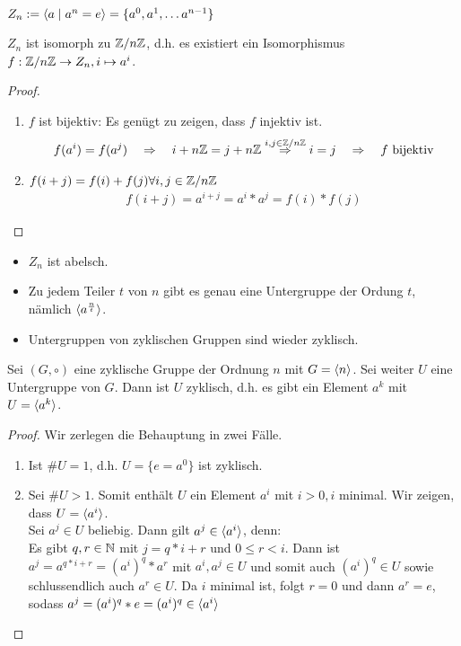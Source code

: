 \begin{defin}
	$Z_n := \langle a \mid a^n = e \rangle = \{a^0,a^1, \dots a^{n-1}\}$
\end{defin}
\begin{lemma}
	$Z_n$ ist isomorph zu $\mathbb{Z} / n \mathbb{Z}$, d.h. es existiert ein Isomorphismus $f: \mathbb{Z} / n \mathbb{Z} \to Z_n, i \mapsto a^i$.
\end{lemma}
\begin{proof}
	\begin{enumerate}
		\item $f$ ist bijektiv: Es genügt zu zeigen, dass $f$ injektiv ist. \\
		\begin{align*}
		f(a^i) = f(a^j) \quad \Rightarrow \quad i + n\mathbb{Z} = j +n\mathbb{Z} \overset{i,j \in \mathbb{Z} / n \mathbb{Z}}{\quad \Rightarrow \quad} i=j \quad \Rightarrow \quad f \text{ bijektiv}
		\end{align*}
		\item $f(i+j) = f(i) + f(j) \forall i,j \in \mathbb{Z} / n \mathbb{Z}$ \\
		\begin{align*}
		f(i+j) = a^{i+j} = a^i * a^j = f(i) * f(j)
		\end{align*}
	\end{enumerate}
\end{proof}

\begin{bem}
	\begin{itemize}
		\item $Z_n$ ist abelsch.
		\item Zu jedem Teiler $t$ von $n$ gibt es genau eine Untergruppe der Ordung $t$, nämlich $\langle a^{\frac{n}{t}} \rangle$.
		\item Untergruppen von zyklischen Gruppen sind wieder zyklisch.
	\end{itemize}
\end{bem}

\begin{lemma}
	Sei $(G,\circ)$ eine zyklische Gruppe der Ordnung $n$ mit $G=\langle n \rangle$. Sei weiter $U$ eine Untergruppe von $G$. Dann ist $U$ zyklisch, d.h. es gibt ein Element $a^k$ mit $U=\langle a^k \rangle$.
\end{lemma}
\begin{proof} Wir zerlegen die Behauptung in zwei Fälle.
	\begin{enumerate}
		\item Ist $\# U = 1$, d.h. $U=\{e=a^0\}$ ist zyklisch.
		\item Sei $\# U > 1$. Somit enthält $U$ ein Element $a^i$ mit $i>0, i$ minimal. Wir zeigen, dass $U=\langle a^i \rangle$. \\
		Sei $a^j \in U$ beliebig. Dann gilt $a^j \in \langle a^i \rangle$, denn: \\
		Es gibt $q,r \in \mathbb{N}$ mit $j = q*i + r$ und $0 \leq r < i$. Dann ist $a^j = a^{q*i + r} = (a^i)^q * a^r$ mit $a^i, a^j \in U$ und somit auch $(a^i)^q \in U$ sowie schlussendlich auch $a^r \in U$. Da $i$ minimal ist, folgt $r=0$ und dann $a^r=e$, sodass $a^j = (a^i)^q * e = (a^i)^q \in \langle a^i \rangle$
	\end{enumerate}
\end{proof}


